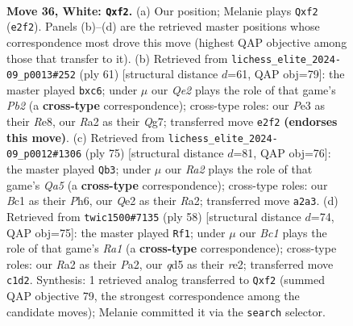 \documentclass[11pt]{article}
\begin{document}
\clearpage

\begin{figure}[p]\centering
\begin{subfigure}{0.46\textwidth}\centering
\resizebox{\linewidth}{!}{%
\newchessgame
\chessboard[
  setfen={7r/r3k3/1pp1p1pp/3q2P1/Pp1P4/1P1KP3/R3Qb2/2B5 w - - 2 36},
  showmover=false,
  pgfstyle=straightmove, color=movearrow, markmove={e2-f2}
]}
\caption{}
\end{subfigure}\hfill
\begin{subfigure}{0.46\textwidth}\centering
\resizebox{\linewidth}{!}{%
\newchessgame
\chessboard[
  setfen={4r3/1p4qk/p1B1p1p1/2p1p1Qp/7P/2PP2P1/PP6/5RK1 b - - 0 31},
  showmover=false,
  pgfstyle=straightmove, color=movearrow, markmove={b7-c6}
]}
\caption{}
\end{subfigure}
\\[4pt]
\begin{subfigure}{0.46\textwidth}\centering
\resizebox{\linewidth}{!}{%
\newchessgame
\chessboard[
  setfen={8/4p1k1/3p1p1p/3P2p1/q1pQPP2/2P3P1/r5P1/2R2K2 b - - 3 38},
  showmover=false,
  pgfstyle=straightmove, color=movearrow, markmove={a4-b3}
]}
\caption{}
\end{subfigure}\hfill
\begin{subfigure}{0.46\textwidth}\centering
\resizebox{\linewidth}{!}{%
\newchessgame
\chessboard[
  setfen={6k1/ppQb1p2/3P2p1/8/3P1qPp/7P/P3rPB1/R5K1 w - - 2 30},
  showmover=false,
  pgfstyle=straightmove, color=movearrow, markmove={a1-f1}
]}
\caption{}
\end{subfigure}
\caption{\textbf{Move 36, White: \texttt{Qxf2}.} (a) Our position; Melanie plays \texttt{Qxf2} (\texttt{e2f2}). Panels (b)--(d) are the retrieved master positions whose correspondence most drove this move (highest QAP objective among those that transfer to it). (b) Retrieved from \texttt{lichess\_elite\_2024-09\_p0013\#252} (ply 61) [structural distance $d$=61, QAP obj=79]: the master played \texttt{bxc6}; under $\mu$ our \emph{Qe2} plays the role of that game's \emph{Pb2} (a \textbf{cross-type} correspondence); cross-type roles: our \emph{P}e3 as their \emph{R}e8, our \emph{R}a2 as their \emph{Q}g7; transferred move \texttt{e2f2} \textbf{(endorses this move)}. (c) Retrieved from \texttt{lichess\_elite\_2024-09\_p0012\#1306} (ply 75) [structural distance $d$=81, QAP obj=76]: the master played \texttt{Qb3}; under $\mu$ our \emph{Ra2} plays the role of that game's \emph{Qa5} (a \textbf{cross-type} correspondence); cross-type roles: our \emph{B}c1 as their \emph{P}h6, our \emph{Q}e2 as their \emph{R}a2; transferred move \texttt{a2a3}. (d) Retrieved from \texttt{twic1500\#7135} (ply 58) [structural distance $d$=74, QAP obj=75]: the master played \texttt{Rf1}; under $\mu$ our \emph{Bc1} plays the role of that game's \emph{Ra1} (a \textbf{cross-type} correspondence); cross-type roles: our \emph{R}a2 as their \emph{P}a2, our \emph{q}d5 as their \emph{r}e2; transferred move \texttt{c1d2}. Synthesis: 1 retrieved analog transferred to \texttt{Qxf2} (summed QAP objective 79, the strongest correspondence among the candidate moves); Melanie committed it via the \texttt{search} selector.}
\label{fig:thought-m70}
\end{figure}
\end{document}

